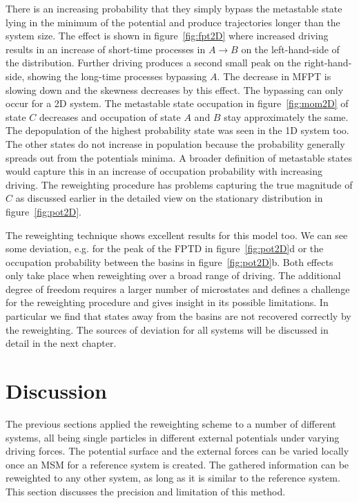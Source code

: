 There is an increasing probability that they simply bypass the metastable state lying in the minimum of the potential and produce trajectories longer than the system size. The effect is shown in figure~\ref{fig:fpt2D} where increased driving results in an increase of short-time processes in $A \rightarrow B$ on the left-hand-side of the distribution. Further driving produces a second small peak on the right-hand-side, showing the long-time processes bypassing $A$. The decrease in MFPT is slowing down and the skewness  decreases by this effect. The bypassing can only occur for a 2D system.  The metastable state occupation in figure~\ref{fig:mom2D} of state $C$ decreases and occupation of state $A$ and $B$ stay approximately the same. The depopulation of the highest probability state was seen in the 1D system too. The other states do not increase in population because the probability generally spreads out from the potentials minima. A broader definition of metastable states would capture this in an increase of occupation probability with increasing driving. The reweighting procedure has problems capturing the true magnitude of $C$ as discussed earlier in the detailed view on the stationary distribution in figure~\ref{fig:pot2D}. 

The reweighting technique shows excellent results for this model too. We can see some deviation, e.g. for the peak of the FPTD in figure~\ref{fig:pot2D}d or the occupation probability between the basins in figure~\ref{fig:pot2D}b. Both effects only take place when reweighting over a broad range of driving. The additional degree of freedom requires a larger number of microstates and defines a challenge for the reweighting procedure and gives insight in its possible limitations. In particular we find that states away from the basins are not recovered correctly by the reweighting. The sources of deviation for all systems will be discussed in detail in the next chapter. 



\FloatBarrier
\section{Discussion}
The previous sections applied the reweighting scheme to a number of different systems, all being single particles in different external potentials under varying driving forces. The potential surface and the external forces can be varied locally once an MSM for a reference system is created. The gathered information can be reweighted to any other system, as long as it is similar to the reference system. This section discusses the precision and limitation of this method.

